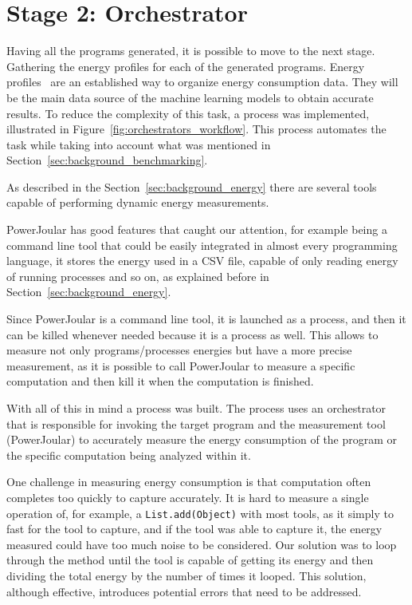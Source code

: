 

\section{Stage 2: Orchestrator} \label{sec:work_stage2_orchestrator}




Having all the programs generated, it is possible to move to the next stage. Gathering the energy profiles for each of the generated programs. 
Energy profiles~\cite{10.1145/2884781.2884869,8816747} are an established way to organize energy consumption data. They will be the main data source of the machine learning models to obtain accurate results. To reduce the complexity of this task, a process was implemented, illustrated in Figure~\ref{fig:orchestrators_workflow}. This process automates the task while taking into account what was mentioned in Section~\ref{sec:background_benchmarking}.

As described in the Section~\ref{sec:background_energy} there are several tools capable of performing dynamic energy measurements.

PowerJoular has good features that caught our attention, for example being a command line tool that could be easily integrated in almost every programming language, it stores the energy used in a CSV file, capable of only reading energy of running processes and so on, as explained before in Section~\ref{sec:background_energy}.

Since PowerJoular is a command line tool, it is launched as a process, and then it can be killed whenever needed because it is a process as well. This allows to measure not only programs/processes energies but have a more precise measurement, as it is possible to call PowerJoular to measure a specific computation and then kill it when the computation is finished.

With all of this in mind a process was built. The process uses an orchestrator that is responsible for invoking the target program and the measurement tool (PowerJoular) to accurately measure the energy consumption of the program or the specific computation being analyzed within it.


One challenge in measuring energy consumption is that computation often completes too quickly to capture accurately. It is hard to measure a single operation of, for example, a \texttt{List.\allowbreak add(Object)} with most tools, as it simply to fast for the tool to capture, and if the tool was able to capture it, the energy measured could have too much noise to be considered. Our solution was to loop through the method until the tool is capable of getting its energy and then dividing the total energy by the number of times it looped. 
This solution, although effective, introduces potential errors that need to be addressed.

